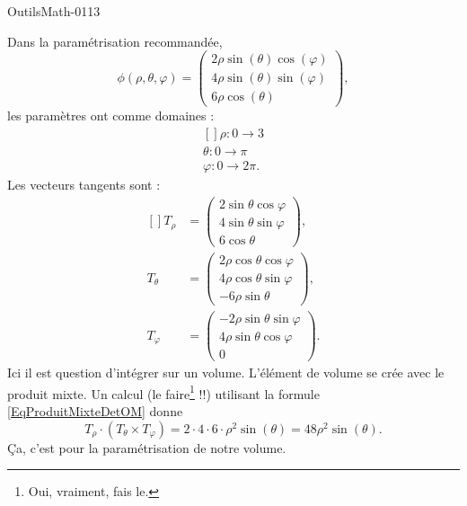 
\begin{corrige}{OutilsMath-0113}

    Dans la paramétrisation recommandée,
    \begin{equation}
        \phi(\rho,\theta,\varphi)=\begin{pmatrix}
            2\rho\sin(\theta)\cos(\varphi)    \\ 
            4\rho\sin(\theta)\sin(\varphi)    \\ 
            6\rho\cos(\theta)    
        \end{pmatrix},
    \end{equation}
    les paramètres ont comme domaines :
    \begin{equation}
        \begin{aligned}[]
            \rho\colon 0\to 3\\
            \theta\colon 0\to \pi\\
            \varphi\colon 0\to 2\pi.
        \end{aligned}
    \end{equation}
    Les vecteurs tangents sont :
    \begin{equation}
        \begin{aligned}[]
            T_{\rho}&=\begin{pmatrix}
                2\sin\theta\cos\varphi    \\ 
                4\sin\theta\sin\varphi    \\ 
                6\cos\theta    
            \end{pmatrix},\\
            T_{\theta}&=\begin{pmatrix}
                2\rho\cos\theta\cos\varphi    \\ 
                4\rho\cos\theta\sin\varphi    \\ 
                -6\rho\sin\theta    
            \end{pmatrix},\\
            T_{\varphi}&=\begin{pmatrix}
                -2\rho\sin\theta\sin\varphi    \\ 
                4\rho\sin\theta\cos\varphi    \\ 
                0    
            \end{pmatrix}.
        \end{aligned}
    \end{equation}
    Ici il est question d'intégrer sur un volume. L'élément de volume se crée avec le produit mixte. Un calcul (le faire\footnote{Oui, vraiment, fais le.} !!) utilisant la formule \eqref{EqProduitMixteDetOM} donne
    \begin{equation}
        T_{\rho}\cdot(T_{\theta}\times T_{\varphi})=2\cdot 4\cdot 6\cdot\rho^2\sin(\theta)=48\rho^2\sin(\theta).
    \end{equation}
    Ça, c'est pour la paramétrisation de notre volume.


\end{corrige}
